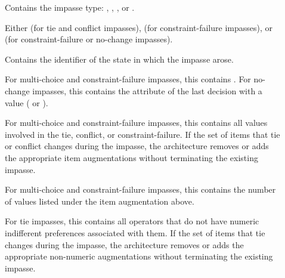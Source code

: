 \vspace{-12pt}
\begin{description} 
\item [] 
	\vspace{-8pt} 
\item [] Contains the impasse type: 
	, , , or .
	\vspace{-8pt} 
\item []Either  (for tie and conflict impasses), 
	 (for constraint-failure impasses), or 
	 (for constraint-failure or no-change impasses).
	\vspace{-8pt} 
\item [] Contains the identifier of the state in which 
	the impasse arose.
	\vspace{-8pt}
\item [] For multi-choice and constraint-failure impasses,
	this contains . For no-change impasses, this contains 
	the attribute of the last decision with a value ( or ).
	\vspace{-8pt}
\item [] For multi-choice and constraint-failure impasses, this 
	contains all values involved in the tie, conflict, or constraint-failure. 
	If the set of items that tie or conflict changes during the impasse, the architecture 
	removes or adds the appropriate item augmentations without terminating the existing impasse.
	\vspace{-8pt}
\item [] For multi-choice and constraint-failure impasses, this 
	contains the number of values listed under the item augmentation above.
	\vspace{-8pt}
\item [] For tie impasses, this contains all operators that
	do not have numeric indifferent preferences associated with them. If the
	set of items that tie changes during the impasse, the architecture
	removes or adds the appropriate non-numeric augmentations without
	terminating the existing impasse.

\end{description}
